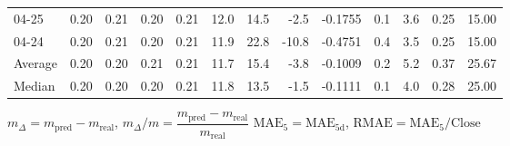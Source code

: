 \begin{threeparttable}
{\begin{tabular}{lrrrrrrrrrrrr}
  04-25 &          0.20 &          0.21 &          0.20 &        0.21 &                12.0 &                14.5 &       -2.5 &      -0.1755 &                 0.1 &              3.6 &            0.25 &                  15.00 \\
  04-24 &          0.20 &          0.21 &          0.20 &        0.21 &                11.9 &                22.8 &      -10.8 &      -0.4751 &                 0.4 &              3.5 &            0.25 &                  15.00 \\
Average &          0.20 &          0.20 &          0.21 &        0.21 &                11.7 &                15.4 &       -3.8 &      -0.1009 &                 0.2 &              5.2 &            0.37 &                  25.67 \\
 Median &          0.20 &          0.20 &          0.20 &        0.21 &                11.8 &                13.5 &       -1.5 &      -0.1111 &                 0.1 &              4.0 &            0.28 &                  25.00 \\
\bottomrule
\end{tabular}
}
\begin{tablenotes}\footnotesize
\item $m_\Delta=m_{\text{pred}}-m_{\text{real}}$,
$m_\Delta/m=\dfrac{m_{\text{pred}}-m_{\text{real}}}{m_{\text{real}}}$
$\mathrm{MAE}_5=\mathrm{MAE}_{5\text{d}}$,
$\mathrm{RMAE}=\mathrm{MAE}_5/\text{Close}$
\end{tablenotes}
\end{threeparttable}
\endgroup

